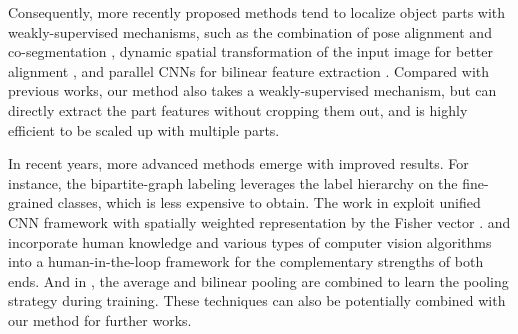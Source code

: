 \documentclass[runningheads]{llncs}
\begin{document}
Consequently, more recently proposed methods tend to localize object parts with weakly-supervised mechanisms,
such as the combination of pose alignment and co-segmentation \cite{krause2015fine}, dynamic spatial transformation of the input image for better alignment \cite{jaderberg2015spatial}, and parallel CNNs for bilinear feature extraction \cite{lin2015bilinear}.
Compared with previous works, our method also takes a weakly-supervised mechanism, but can directly extract the part features without cropping them out, and is highly efficient to be scaled up with multiple parts.

In recent years, more advanced methods emerge with improved results.
For instance, the bipartite-graph labeling \cite{zhou2016fine} leverages the label hierarchy on the fine-grained classes, which is less expensive to obtain.
The work in \cite{zhang2016picking} exploit unified CNN framework with spatially weighted representation by the Fisher vector \cite{perronnin2015fisher}.
\cite{branson2014ignorant} and \cite{wilber2015learning} incorporate human knowledge and various types of computer vision algorithms into a human-in-the-loop framework for the complementary strengths of both ends.
And in \cite{simon2017generalized}, the average and bilinear pooling are combined to learn the pooling strategy during training.
These techniques can also be potentially combined with our method for further works.

\vspace{-.1in}
\end{document}
